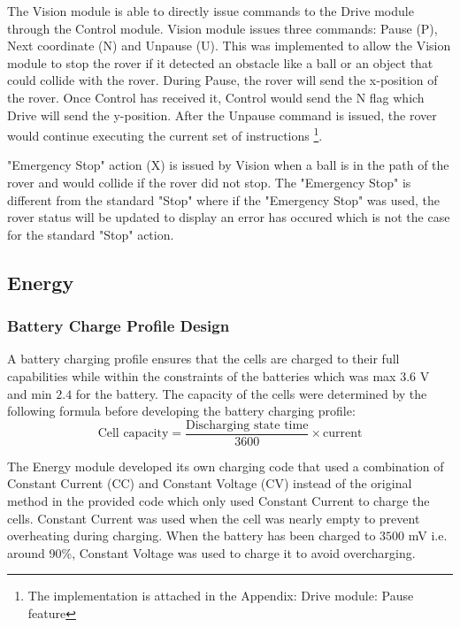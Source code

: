 \documentclass[11pt, a4paper]{article}
\begin{document}
The Vision module is able to directly issue commands to the Drive module through the Control module. Vision module issues three commands: Pause (P), Next coordinate (N) and Unpause (U). This was implemented to allow the Vision module to stop the rover if it detected an obstacle like a ball or an object that could collide with the rover. During Pause, the rover will send the x-position of the rover. Once Control has received it, Control would send the N flag which Drive will send the y-position. After the Unpause command is issued, the rover would continue executing the current set of instructions \footnote{The implementation is attached in the Appendix: Drive module: Pause feature}.
    
"Emergency Stop" action (X) is issued by Vision when a ball is in the path of the rover and would collide if the rover did not stop. The "Emergency Stop" is different from the standard "Stop" where if the "Emergency Stop" was used, the rover status will be updated to display an error has occured which is not the case for the standard "Stop" action. 


\pagebreak
\subsection{Energy}
\subsubsection{Battery Charge Profile Design}

A battery charging profile ensures that the cells are charged to their full capabilities while within the constraints of the batteries which was max $3.6$ V and min $2.4$ for the battery. The capacity of the cells were determined by the following formula before developing the battery charging profile:
$$
\text{Cell capacity} = \frac{\text{Discharging state time}}{3600} \times \text{current}
$$

The Energy module developed its own charging code that used a combination of Constant Current (CC) and Constant Voltage (CV) instead of the original method in the provided code which only used Constant Current to charge the cells. Constant Current was used when the cell was nearly empty to prevent overheating during charging\cite{Energy_constant_current}. When the battery has been charged to $3500$ mV i.e. around 90\%, Constant Voltage was used to charge it to avoid overcharging. 
\end{document}
